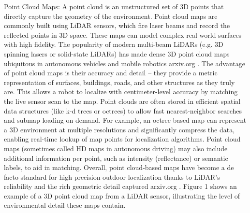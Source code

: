     Point Cloud Maps: A point cloud is an unstructured set of 3D points that directly capture the geometry of the environment. Point cloud maps are commonly built using LiDAR sensors, which fire laser beams and record the reflected points in 3D space. These maps can model complex real-world surfaces with high fidelity. The popularity of modern multi-beam LiDARs (e.g. 3D spinning lasers or solid-state LiDARs) has made dense 3D point cloud maps ubiquitous in autonomous vehicles and mobile robotics​
    arxiv.org
    . The advantage of point cloud maps is their accuracy and detail – they provide a metric representation of surfaces, buildings, roads, and other structures as they truly are. This allows a robot to localize with centimeter-level accuracy by matching the live sensor scan to the map. Point clouds are often stored in efficient spatial data structures (like k-d trees or octrees) to allow fast nearest-neighbor searches and submap loading on demand. For example, an octree-based map can represent a 3D environment at multiple resolutions and significantly compress the data, enabling real-time lookup of map points for localization algorithms. Point cloud maps (sometimes called HD maps in autonomous driving) may also include additional information per point, such as intensity (reflectance) or semantic labels, to aid in matching. Overall, point cloud-based maps have become a de facto standard for high-precision outdoor localization thanks to LiDAR’s reliability and the rich geometric detail captured​
    arxiv.org
    . Figure 1 shows an example of a 3D point cloud map from a LiDAR sensor, illustrating the level of environmental detail these maps contain.

